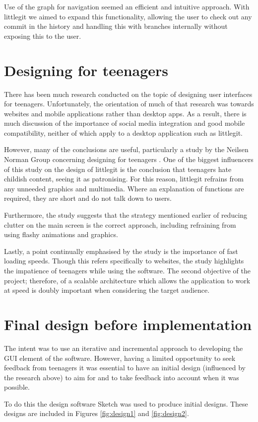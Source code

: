 Use of the graph for navigation seemed an efficient and intuitive approach. With littlegit we aimed to expand this functionality, allowing the user to check out any commit in the history and handling this with branches internally without exposing this to the user.

\section {Designing for teenagers}\label{sec:teen-design}

There has been much research conducted on the topic of designing user interfaces for teenagers. Unfortunately, the orientation of much of that research was towards websites and mobile applications rather than desktop apps. As a result, there is much discussion of the importance of social media integration and good mobile compatibility, neither of which apply to a desktop application such as littlegit.

However, many of the conclusions are useful, particularly a study by the Neilsen Norman Group concerning designing for teenagers \cite{teendesign}. One of the biggest influencers of this study on the design of littlegit is the conclusion that teenagers hate childish content, seeing it as patronising. For this reason, littlegit refrains from any unneeded graphics and multimedia. Where an explanation of functions are required, they are short and do not talk down to users.

Furthermore, the study suggests that the strategy mentioned earlier of reducing clutter on the main screen is the correct approach, including refraining from using flashy animations and graphics.

Lastly, a point continually emphasised by the study is the importance of fast loading speeds. Though this refers specifically to websites, the study highlights the impatience of teenagers while using the software.  The second objective of the project; therefore, of a scalable architecture which allows the application to work at speed is doubly important when considering the target audience.

\section{Final design before implementation}

The intent was to use an iterative and incremental approach to developing the GUI element of the software. However, having a limited opportunity to seek feedback from teenagers it was essential to have an initial design (influenced by the research above) to aim for and to take feedback into account when it was possible.

To do this the design software Sketch \cite{sketch} was used to produce initial designs. These designs are included in Figures \ref{fig:design1} and \ref{fig:design2}.





